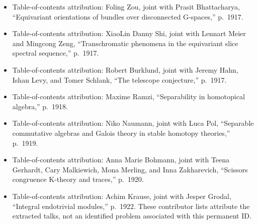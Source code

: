 \documentclass[11pt]{article}
\begin{document}
\begin{itemize}
\item Table-of-contents attribution: Foling Zou, joint with Prasit Bhattacharya, ``Equivariant orientations of bundles over disconnected G-spaces,'' p.~1917.
\item Table-of-contents attribution: XiaoLin Danny Shi, joint with Lennart Meier and Mingcong Zeng, ``Transchromatic phenomena in the equivariant slice spectral sequence,'' p.~1917.
\item Table-of-contents attribution: Robert Burklund, joint with Jeremy Hahn, Ishan Levy, and Tomer Schlank, ``The telescope conjecture,'' p.~1917.
\item Table-of-contents attribution: Maxime Ramzi, ``Separability in homotopical algebra,'' p.~1918.
\item Table-of-contents attribution: Niko Naumann, joint with Luca Pol, ``Separable commutative algebras and Galois theory in stable homotopy theories,'' p.~1919.
\item Table-of-contents attribution: Anna Marie Bohmann, joint with Teena Gerhardt, Cary Malkiewich, Mona Merling, and Inna Zakharevich, ``Scissors congruence K-theory and traces,'' p.~1920.
\item Table-of-contents attribution: Achim Krause, joint with Jesper Grodal, ``Integral endotrivial modules,'' p.~1922. These contributor lists attribute the extracted talks, not an identified problem associated with this permanent ID.
\end{itemize}
\end{document}
